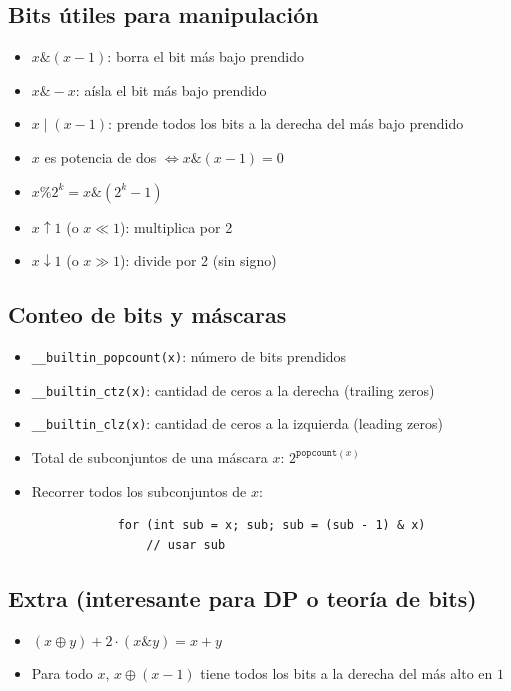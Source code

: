 \documentclass[12pt]{article}
\begin{document}
    \subsection{Bits útiles para manipulación}
        \begin{itemize}
            \item $x \& (x - 1)$: borra el bit más bajo prendido
            \item $x \& -x$: aísla el bit más bajo prendido
            \item $x \mid (x - 1)$: prende todos los bits a la derecha del más bajo prendido
            \item $x$ es potencia de dos $\iff x \& (x - 1) = 0$
            \item $x \% 2^k = x \& (2^k - 1)$
            \item $x \uparrow 1$ (o $x \ll 1$): multiplica por 2
            \item $x \downarrow 1$ (o $x \gg 1$): divide por 2 (sin signo)
        \end{itemize}
    \subsection{Conteo de bits y máscaras}
        \begin{itemize}
            \item \texttt{\_\_builtin\_popcount(x)}: número de bits prendidos
            \item \texttt{\_\_builtin\_ctz(x)}: cantidad de ceros a la derecha (trailing zeros)
            \item \texttt{\_\_builtin\_clz(x)}: cantidad de ceros a la izquierda (leading zeros)
            \item Total de subconjuntos de una máscara $x$: $2^{\texttt{popcount}(x)}$
            \item Recorrer todos los subconjuntos de $x$:
            
            \begin{verbatim}
            for (int sub = x; sub; sub = (sub - 1) & x)
                // usar sub
            \end{verbatim}
        \end{itemize}

    \subsection{Extra (interesante para DP o teoría de bits)}
    \begin{itemize}
        \item $(x \oplus y) + 2 \cdot (x \& y) = x + y$
        \item Para todo $x$, $x \oplus (x - 1)$ tiene todos los bits a la derecha del más alto en $1$
    \end{itemize}
\end{document}
